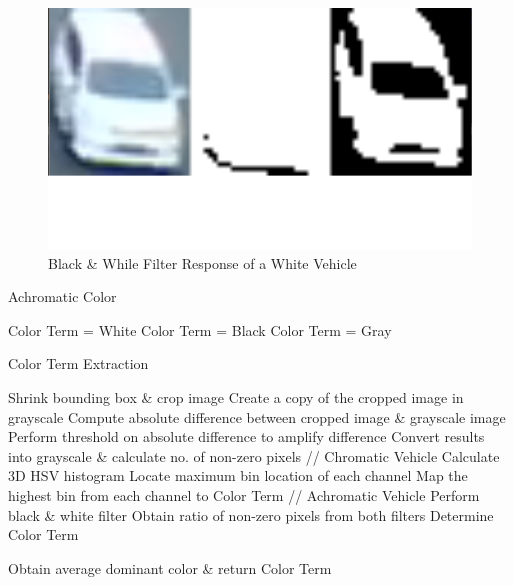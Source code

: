 \begin{figure}[hbt!]\centering
\includegraphics[width=.7\textwidth]{image/general/blackwhitefilter.PNG}
\caption{Black \& While Filter Response of a White Vehicle}
\label{fig:blackwhite_filter}
\end{figure}


 \begin{algorithm}[!ht]
  \caption{Achromatic Color}
  \label{algo:achromatic}
  \begin{algorithmic}[1]
  
	\State Color Term = White  	
  	\State Color Term = Black
  \Else
  	\State Color Term = Gray
  \EndIf
  
  \end{algorithmic}
\end{algorithm}

 
 \begin{algorithm}[!h]
  \caption{Color Term Extraction}
  \label{algo:colorExtract}
  \begin{algorithmic}[1]
        \State Shrink bounding box \& crop image
        \State Create a copy of the cropped image in grayscale
        \State Compute absolute difference between cropped image \& grayscale image
        \State Perform threshold on absolute difference to amplify difference
        \State Convert results into grayscale \& calculate no. of non-zero pixels
                \State // Chromatic Vehicle
                \State Calculate 3D HSV histogram  
                \State Locate maximum bin location of each channel
                \State Map the highest bin from each channel to Color Term
            \Else 
                \State // Achromatic Vehicle
                \State Perform black \& white filter 
                \State Obtain ratio of non-zero pixels from both filters
                \State Determine Color Term
            \EndIf

    \EndFor
    \State Obtain average dominant color \& return Color Term
  \end{algorithmic}
\end{algorithm}



